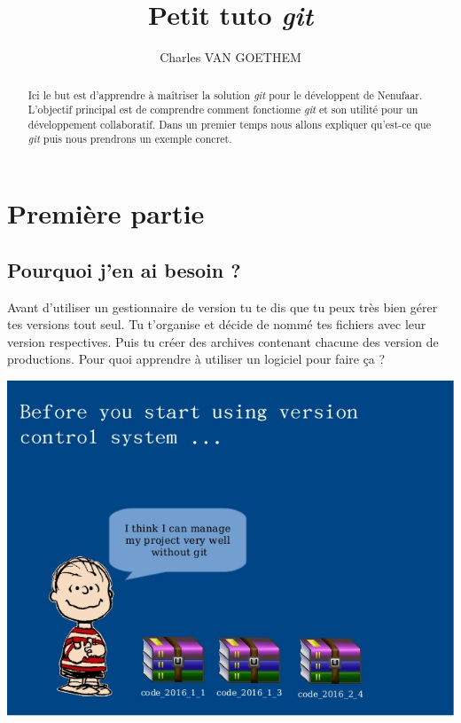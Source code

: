 \documentclass[12pt,a4paper]{article}
\title{Petit tuto \emph{git}}
\author{Charles VAN GOETHEM}
\date{}
\newenvironment{problematique}{
\renewcommand{\abstractname}{Problématique}
\begin{abstract}
}{
\end{abstract}
}
\begin{document}
\maketitle

\begin{problematique}
Ici le but est d'apprendre à maîtriser la solution \emph{git} pour le développent de Nenufaar. L'objectif principal est de comprendre comment fonctionne \emph{git} et son utilité pour un développement collaboratif. Dans un premier temps nous allons expliquer qu'est-ce que \emph{git} puis nous prendrons un exemple concret.
\end{problematique}

\section{Première partie}

\subsection{Pourquoi j'en ai besoin ?}

Avant d'utiliser un gestionnaire de version tu te dis que tu peux très bien gérer tes versions tout seul. Tu t'organise et décide de nommé tes fichiers avec leur version respectives. Puis tu créer des archives contenant chacune des version de productions. Pour quoi apprendre à utiliser un logiciel pour faire ça ?

\begin{center}
\includegraphics[width=.75\linewidth]{before_git}
\end{center}

\newpage
\end{document}
